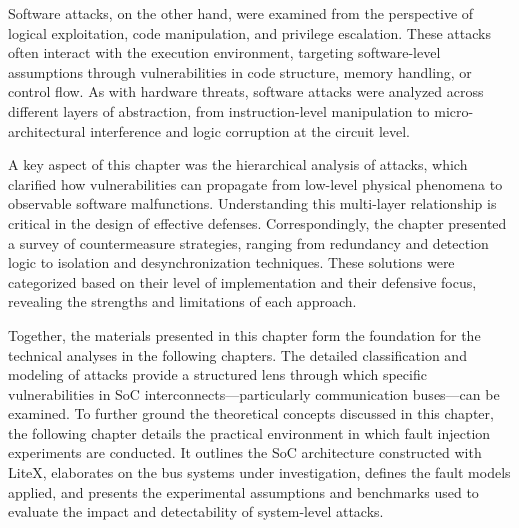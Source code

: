 Software attacks, on the other hand, were examined from the perspective of logical exploitation, code manipulation, and privilege escalation. These attacks often interact with the execution environment, targeting software-level assumptions through vulnerabilities in code structure, memory handling, or control flow. As with hardware threats, software attacks were analyzed across different layers of abstraction, from instruction-level manipulation to micro-architectural interference and logic corruption at the circuit level.

A key aspect of this chapter was the hierarchical analysis of attacks, which clarified how vulnerabilities can propagate from low-level physical phenomena to observable software malfunctions. Understanding this multi-layer relationship is critical in the design of effective defenses. Correspondingly, the chapter presented a survey of countermeasure strategies, ranging from redundancy and detection logic to isolation and desynchronization techniques. These solutions were categorized based on their level of implementation and their defensive focus, revealing the strengths and limitations of each approach.

Together, the materials presented in this chapter form the foundation for the technical analyses in the following chapters. The detailed classification and modeling of attacks provide a structured lens through which specific vulnerabilities in SoC interconnects—particularly communication buses—can be examined. To further ground the theoretical concepts discussed in this chapter, the following chapter details the practical environment in which fault injection experiments are conducted. It outlines the SoC architecture constructed with LiteX, elaborates on the bus systems under investigation, defines the fault models applied, and presents the experimental assumptions and benchmarks used to evaluate the impact and detectability of system-level attacks.